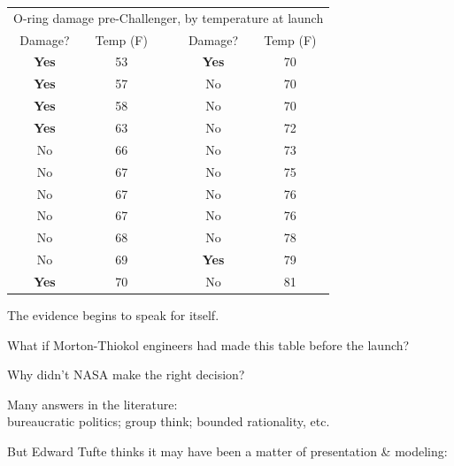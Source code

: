 \documentclass[pdflatex,landscape,titlepage]{foils}
\begin{document}
\begin{center}
\begin{tabular}{ccccc}
\toprule
\multicolumn{5}{c}{O-ring damage pre-Challenger, by temperature at launch}\\
Damage? &       Temp (F)        &       &       Damage? &       Temp (F)        \\
\midrule
\color{red} \textbf{Yes}        &       \color{red} 53  & \quad\quad\quad& \color{red} \textbf{Yes}     &       \color{red}70   \\
\color{red} \textbf{Yes}        &       \color{red}57   &       &       No       &       70      \\
\color{red} \textbf{Yes}        &       \color{red}58   &       &       No       &       70      \\
\color{red} \textbf{Yes}        &       \color{red}63   &       &       No       &       72      \\
No       &       66      &       &       No       &       73      \\
No       &       67      &       &       No       &       75      \\
No       &       67      &       &       No       &       76      \\
No       &       67      &       &       No       &       76      \\
No       &       68      &       &       No       &       78      \\
No       &       69      &       &       \color{red} \textbf{Yes}        &       \color{red}79   \\
\color{red} \textbf{Yes}        &       \color{red}70   &       &       No       &       81      \\
\bottomrule
\end{tabular}
\end{center}

The evidence begins to speak for itself.

What if Morton-Thiokol engineers had made this table before the launch?


Why didn't NASA make the right decision?

Many answers in the literature:  \\
bureaucratic politics; group think; bounded rationality, etc.

But Edward Tufte thinks it may have been a matter of presentation \& modeling:
\end{document}
